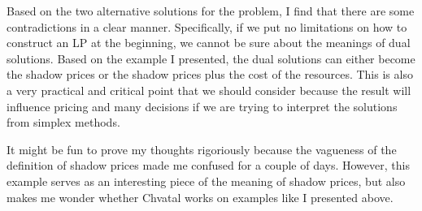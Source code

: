 \documentclass{article}
\begin{document}
Based on the two alternative solutions for the problem, I find that there are some contradictions 
in a clear manner. Specifically, if we put no limitations on how to construct an LP at the beginning,
we cannot be sure about the meanings of dual solutions. Based on the example I presented,
the dual solutions can either become the shadow prices or the shadow prices plus the cost of 
the resources. This is also a very practical and critical point that we should consider because 
the result will influence pricing and many decisions if we are trying to interpret the 
solutions from simplex methods.

It might be fun to prove my thoughts rigoriously because the vagueness of the definition of 
shadow prices made me confused for a couple of days. However, this example serves as an interesting 
piece of the meaning of shadow prices, but also makes me wonder whether Chvatal works on 
examples like I presented above.
\end{document}
